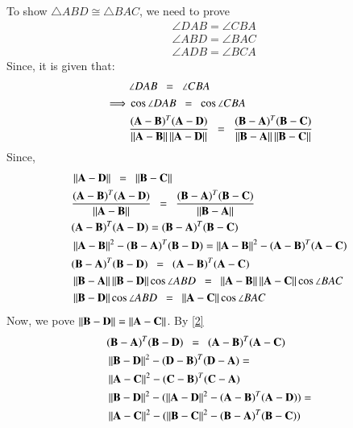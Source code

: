 \documentclass[journal,12pt,twocolumn]{IEEEtran}
\begin{document}
To show $\triangle ABD \cong \triangle BAC$, we need to prove
\begin{align}
 & \angle DAB = \angle CBA \label{9}\\
 & \angle ABD = \angle BAC \\
 & \angle ADB = \angle BCA
\end{align}
Since, it is given that:
\begin{align}
 & \angle DAB \enspace = \enspace \angle CBA \label{1} \\
 \implies &\cos\angle DAB \enspace = \enspace \cos\angle CBA \\
 &  \frac{(\mathbf A -\mathbf B)^T(\mathbf{A}-\mathbf{D})}{\left\lVert\mathbf{A}-\mathbf{B}\right\rVert \left\lVert\mathbf{A}-\mathbf{D}\right\rVert } \enspace = \enspace \frac{(\mathbf B -\mathbf A)^T(\mathbf{B}-\mathbf{C})}{\left\lVert\mathbf{B}-\mathbf{A}\right\rVert \left\lVert\mathbf{B}-\mathbf{C}\right\rVert }
\end{align}
Since,
\begin{align}
& \left\lVert\mathbf{A}-\mathbf{D}\right\rVert \enspace = \enspace \left\lVert\mathbf{B}-\mathbf{C}\right\rVert \\
& \frac{(\mathbf A -\mathbf B)^T(\mathbf{A}-\mathbf{D})}{\left\lVert\mathbf{A}-\mathbf{B}\right\rVert} \enspace = \enspace \frac{(\mathbf B -\mathbf A)^T(\mathbf{B}-\mathbf{C})}{\left\lVert\mathbf{B}-\mathbf{A}\right\rVert} \\
& (\mathbf A -\mathbf B)^T(\mathbf{A}-\mathbf{D}) =  (\mathbf B -\mathbf A)^T(\mathbf{B}-\mathbf{C}) \\
& \left\lVert\mathbf{A}-\mathbf{B}\right\rVert^2 - (\mathbf B -\mathbf A)^T(\mathbf{B}-\mathbf{D})= \left\lVert\mathbf{A}-\mathbf{B}\right\rVert^2 - (\mathbf A -\mathbf B)^T(\mathbf{A}-\mathbf{C})\\
& (\mathbf B -\mathbf A)^T(\mathbf{B}-\mathbf{D}) \enspace = \enspace (\mathbf A -\mathbf B)^T(\mathbf{A}-\mathbf{C})\label{2} \\
& \left\lVert\mathbf{B} - \mathbf{A}\right\rVert\left\lVert\mathbf{B} - \mathbf{D}\right\rVert\cos\angle ABD \enspace = \enspace \left\lVert\mathbf{A} - \mathbf{B}\right\rVert\left\lVert\mathbf{A} - \mathbf{C}\right\rVert\cos\angle BAC \\
& \left\lVert\mathbf{B} - \mathbf{D}\right\rVert\cos\angle ABD \enspace = \enspace \left\lVert\mathbf{A} - \mathbf{C}\right\rVert\cos\angle BAC\label{6}
\end{align}
Now, we pove $\left\lVert\mathbf{B} - \mathbf{D}\right\rVert = \left\lVert\mathbf{A} - \mathbf{C}\right\rVert$. By \ref{2}
\begin{align}
& (\mathbf B -\mathbf A)^T(\mathbf{B}-\mathbf{D}) \enspace = \enspace (\mathbf A -\mathbf B)^T(\mathbf{A}-\mathbf{C}) \\
& \left\lVert\mathbf{B}-\mathbf{D}\right\rVert^2 - (\mathbf D -\mathbf B)^T(\mathbf{D}-\mathbf{A})= \\
& \left\lVert\mathbf{A}-\mathbf{C}\right\rVert^2 - (\mathbf C -\mathbf B)^T(\mathbf{C}-\mathbf{A}) \\
&  \left\lVert\mathbf{B}-\mathbf{D}\right\rVert^2 - (\left\lVert\mathbf{A}-\mathbf{D}\right\rVert^2 - (\mathbf A -\mathbf B)^T(\mathbf A -\mathbf D))   = \\
& \left\lVert\mathbf{A}-\mathbf{C}\right\rVert^2 - (\left\lVert\mathbf{B}-\mathbf{C}\right\rVert^2 - (\mathbf B -\mathbf A)^T(\mathbf B -\mathbf C))\
\end{align}
\end{document}
